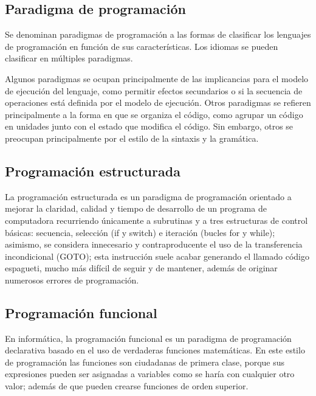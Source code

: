 \subsection{Paradigma de programación}

Se denominan paradigmas de programación a las formas de clasificar los lenguajes de programación en función de sus características. Los idiomas se pueden clasificar en múltiples paradigmas.

Algunos paradigmas se ocupan principalmente de las implicancias para el modelo de ejecución del lenguaje, como permitir efectos secundarios o si la secuencia de operaciones está definida por el modelo de ejecución. Otros paradigmas se refieren principalmente a la forma en que se organiza el código, como agrupar un código en unidades junto con el estado que modifica el código. Sin embargo, otros se preocupan principalmente por el estilo de la sintaxis y la gramática. 

\subsection{Programación estructurada}
La programación estructurada es un paradigma de programación orientado a mejorar la claridad, calidad y tiempo de desarrollo de un programa de computadora recurriendo únicamente a subrutinas y a tres estructuras de control básicas: secuencia, selección (if y switch) e iteración (bucles for y while); asimismo, se considera innecesario y contraproducente el uso de la transferencia incondicional (GOTO); esta instrucción suele acabar generando el llamado código espagueti, mucho más difícil de seguir y de mantener, además de originar numerosos errores de programación.

\subsection{Programación funcional}
En informática, la programación funcional es un paradigma de programación declarativa basado en el uso de verdaderas funciones matemáticas. En este estilo de programación las funciones son ciudadanas de primera clase, porque sus expresiones pueden ser asignadas a variables como se haría con cualquier otro valor; además de que pueden crearse funciones de orden superior.